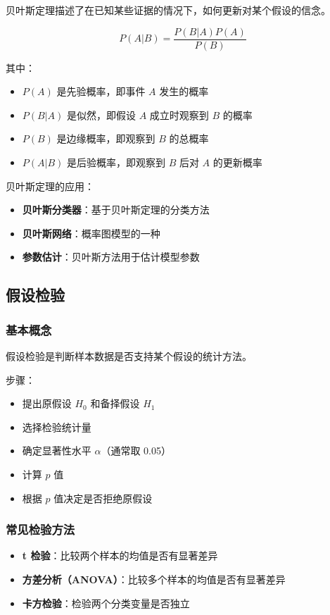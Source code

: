 \documentclass[12pt,UTF8]{ctexbook}
\begin{document}
贝叶斯定理描述了在已知某些证据的情况下，如何更新对某个假设的信念。

$$P(A|B) = \frac{P(B|A) P(A)}{P(B)}$$

其中：
\begin{itemize}[leftmargin=2cm]
    \item $P(A)$ 是先验概率，即事件 $A$ 发生的概率
    \item $P(B|A)$ 是似然，即假设 $A$ 成立时观察到 $B$ 的概率
    \item $P(B)$ 是边缘概率，即观察到 $B$ 的总概率
    \item $P(A|B)$ 是后验概率，即观察到 $B$ 后对 $A$ 的更新概率
\end{itemize}

贝叶斯定理的应用：
\begin{itemize}[leftmargin=2cm]
    \item \textbf{贝叶斯分类器}：基于贝叶斯定理的分类方法
    \item \textbf{贝叶斯网络}：概率图模型的一种
    \item \textbf{参数估计}：贝叶斯方法用于估计模型参数
\end{itemize}

\subsection{假设检验}

\subsubsection{基本概念}

假设检验是判断样本数据是否支持某个假设的统计方法。

步骤：
\begin{itemize}[leftmargin=2cm]
    \item 提出原假设 $H_0$ 和备择假设 $H_1$
    \item 选择检验统计量
    \item 确定显著性水平 $\alpha$（通常取 0.05）
    \item 计算 $p$ 值
    \item 根据 $p$ 值决定是否拒绝原假设
\end{itemize}

\subsubsection{常见检验方法}

\begin{itemize}[leftmargin=2cm]
    \item \textbf{t 检验}：比较两个样本的均值是否有显著差异
    \item \textbf{方差分析（ANOVA）}：比较多个样本的均值是否有显著差异
    \item \textbf{卡方检验}：检验两个分类变量是否独立
\end{itemize}
\end{document}
